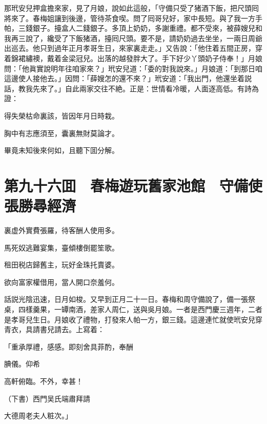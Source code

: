 那玳安兒押盒擔來家，見了月娘，說如此這般，「守備只受了猪酒下飯，把尺頭囘將來了。春梅姐讓到後邊，管待茶食喫。問了囘哥兒好，家中長短。與了我一方手帕，三錢銀子。擡盒人二錢銀子。多頂上奶奶，多謝重禮。都不受來，被薛嫂兒和我再三說了，纔受了下飯猪酒，擡囘尺頭。要不是，請奶奶過去坐坐，一兩日周爺出巡去。他只到過年正月孝哥生日，來家裏走走。」又告說：「他住着五間正房，穿着錦裙繡襖，戴着金梁冠兒。出落的越發胖大了。手下好少丫頭奶子侍奉！」月娘問：「他眞實說明年往咱家來？」玳安兒道：「委的對我說來。」月娘道：「到那日咱這邊使人接他去。」因問：「薛嫂怎的還不來？」玳安道：「我出門，他還坐着説話，教我先來了。」自此兩家交往不絶。正是：世情看冷暖，人面逐高低。有詩為證：

得失榮枯命裏該，皆因年月日時栽。

胸中有志應須至，囊裏無財莫論才。

畢竟未知後來何如，且聽下囬分解。

\chapter*{第九十六囬　春梅遊玩舊家池館　守備使張勝尋經濟}

裏虚外實費張羅，待客酬人使用多。

馬死奴逃難宴集，臺傾樓倒罷笙歌。

租田税店歸舊主，玩好金珠托賣婆。

欲向富家權借用，當人開口奈羞何。

話説光陰迅速，日月如梭。又早到正月二十一日。春梅和周守備說了，備一張祭桌，四樣羹果，一罈南酒，差家人周仁，送與吳月娘。一者是西門慶三週年，二者是孝哥兒生日。月娘收了禮物，打發來人帕一方，銀三錢。這邊連忙就使玳安兒穿青衣，具請書兒請去。上寫着：

「重承厚禮，感感。即刻舍具菲酌，奉酬

腆儀。仰希

高軒俯臨。不外，幸甚！

（下書）西門吴氏端肅拜請

大德周老夫人粧次。」

